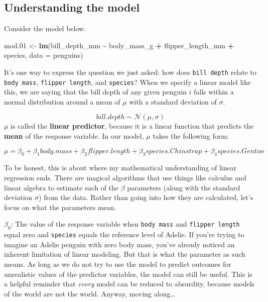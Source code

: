 \documentclass[
]{article}
\newenvironment{Shaded}{\begin{snugshade}}{\end{snugshade}}
\newcommand{\AttributeTok}[1]{\textcolor[rgb]{0.13,0.29,0.53}{#1}}
\newcommand{\FloatTok}[1]{\textcolor[rgb]{0.00,0.00,0.81}{#1}}
\newcommand{\FunctionTok}[1]{\textcolor[rgb]{0.13,0.29,0.53}{\textbf{#1}}}
\newcommand{\NormalTok}[1]{#1}
\newcommand{\OtherTok}[1]{\textcolor[rgb]{0.56,0.35,0.01}{#1}}
\newcommand{\SpecialCharTok}[1]{\textcolor[rgb]{0.81,0.36,0.00}{\textbf{#1}}}
\begin{document}
\hypertarget{understanding-the-model}{%
\subsection{Understanding the model}\label{understanding-the-model}}

Consider the model below.

\begin{Shaded}
\begin{Highlighting}[]
\NormalTok{mod}\FloatTok{.01} \OtherTok{\textless{}{-}} \FunctionTok{lm}\NormalTok{(bill\_depth\_mm }\SpecialCharTok{\textasciitilde{}}\NormalTok{ body\_mass\_g }\SpecialCharTok{+}\NormalTok{ flipper\_length\_mm }\SpecialCharTok{+}\NormalTok{ species,}
             \AttributeTok{data =}\NormalTok{ penguins)}
\end{Highlighting}
\end{Shaded}

It's one way to express the question we just asked: how does
\texttt{bill\ depth} relate to \texttt{body\ mass},
\texttt{flipper\ length}, and \texttt{species}? When we specify a linear
model like this, we are saying that the bill depth of any given penguin
\(i\) falls within a normal distribution around a mean of \(\mu\) with a
standard deviation of \(\sigma\).

\[ bill.depth \sim \mathcal{N}(\mu, \sigma) \] \(\mu\) is called the
\textbf{linear predictor}, because it is a linear function that predicts
the \textbf{mean} of the response variable. In our model, \(\mu\) takes
the following form:

\[ \mu =  \beta_0 + \beta_1body.mass + \beta_2flipper.length + \beta_3species.Chinstrap + \beta_4species.Gentoo \]

To be honest, this is about where my mathematical understanding of
linear regression ends. There are magical algorithms that use things
like calculus and linear algebra to estimate each of the \(\beta\)
parameters (along with the standard deviation \(\sigma\)) from the data.
Rather than going into how they are calculated, let's focus on what the
parameters mean.

\(\beta_0\): The value of the response variable when \texttt{body\ mass}
and \texttt{flipper\ length} equal zero and \texttt{species} equals the
reference level of Adelie. If you're trying to imagine an Adelie penguin
with zero body mass, you've already noticed an inherent limitation of
linear modeling. But that is what the parameter as such means. As long
as we do not try to use the model to predict outcomes for unrealistic
values of the predictor variables, the model can still be useful. This
is a helpful reminder that \emph{every} model can be reduced to
absurdity, because models of the world are not the world. Anyway, moving
along\ldots{}
\end{document}
